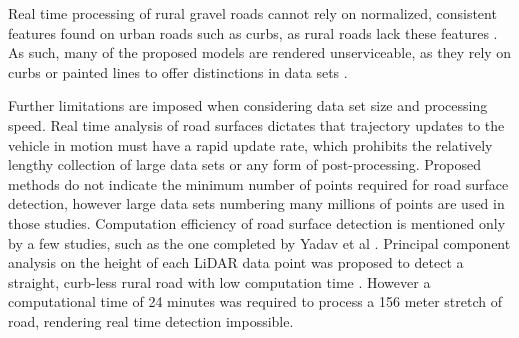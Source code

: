 \documentclass[journal,onecolumn]{IEEEtran}
\begin{document}
	{Real time processing of rural gravel roads cannot rely on normalized, consistent features found on urban roads such as curbs, as rural roads lack these features \cite{skorseth_gravel_nodate}. As such, many of the proposed models are rendered unserviceable, as they rely on curbs or painted lines to offer distinctions in data sets \cite{yadav_extraction_2017,liu_new_2013,qiu_fast_2016,fernandes_road_2014,seker_experiments_nodate,yang_semi-automated_2013,miyazaki_line-based_2014,hervieu_road_2013,smadja_road_nodate}.}
	
	{Further limitations are imposed when considering data set size and processing speed. Real time analysis of road surfaces dictates that trajectory updates to the vehicle in motion must have a rapid update rate, which prohibits the relatively lengthy collection of large data sets or any form of post-processing. Proposed methods \cite{yadav_extraction_2017,yadav_road_2018,yadav_rural_2018,yadav_pole-shaped_2015,miyazaki_line-based_2014,yang_semi-automated_2013,liu_new_2013,qiu_fast_2016} do not indicate the minimum number of points required for road surface detection, however large data sets numbering many millions of points are used in those studies. Computation efficiency of road surface detection is mentioned only by a few studies, such as the one completed by Yadav et al \cite{yadav_road_2018}. Principal component analysis on the height of each LiDAR data point was proposed to detect a straight, curb-less rural road with low computation time \cite{yadav_road_2018}. However a computational time of 24 minutes was required to process a 156 meter stretch of road, rendering real time detection impossible.}
	
	
\end{document}
